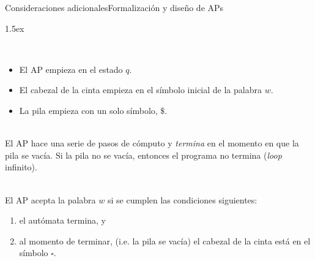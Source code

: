 \documentclass[spanish]{beamer}
\begin{document}
{%
\begin{frame}{Consideraciones adicionales}{Formalización y diseño de APs}
    \begin{description}
        \itemsep1.5ex
        \item[Configuración inicial] \hfill \\ 
        \begin{itemize}
            \item El AP empieza en el estado $q$. \pause 
            \item El cabezal de la cinta empieza en el símbolo inicial de la palabra $w$. \pause 
            \item La pila empieza con un solo símbolo, $\$$. \pause 
        \end{itemize}

        \item[Cómputo y terminación] \hfill \\ 
        El AP hace una serie de pasos de cómputo y \textit{termina} en el momento en que la pila se vacía. Si la pila no se vacía, entonces el programa no termina (\textit{loop} infinito). \pause 
        \item[Aceptación] \hfill \\ 
        El AP acepta la palabra $w$ si se cumplen las condiciones siguientes:
        \begin{enumerate}
            \item el autómata termina, y \pause 
            \item al momento de terminar, (i.e. la pila se vacía) el cabezal de la cinta está en el símbolo $\square$.
        \end{enumerate}
    \end{description}
\end{frame}
}
\end{document}
